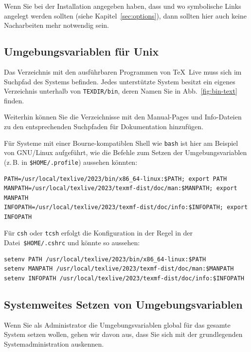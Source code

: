 \documentclass[12pt,ngerman,a4paper,fullparskip]{report}
\newcommand{\TL}{\TeX\ Live\xspace}
\newcommand{\prog}[1]{\texttt{#1}}
\newcommand{\filename}[1]{\texttt{#1}}
\newcommand{\dirname}[1]{\texttt{#1}}
\begin{document}
Wenn Sie bei der Installation angegeben haben, dass und wo symbolische Links angelegt werden sollten (siehe Kapitel~\ref{sec:options}), dann sollten hier auch keine Nacharbeiten mehr notwendig sein.

\subsection{Umgebungsvariablen für Unix}
\label{sec:env}

Das Verzeichnis mit den ausführbaren Programmen von \TL muss sich im Suchpfad des Systems befinden.
Jedes unterstützte System besitzt ein eigenes Verzeichnis unterhalb von \dirname{TEXDIR/bin}, deren
Namen Sie in Abb.~\ref{fig:bin-text} finden.

Weiterhin können Sie die Verzeichnisse mit den Manual-Pages und Info-Dateien zu den entsprechenden
Suchpfaden für Dokumentation hinzufügen.

Für Systeme mit einer Bourne-kompatiblen Shell wie \prog{bash} ist hier am Beispiel von GNU/Linux
aufgeführt, wie die Befehle zum Setzen der Umgebungsvariablen (z.\,B. in \filename{\$HOME/.profile})
aussehen könnten:

\begin{verbatim}
PATH=/usr/local/texlive/2023/bin/x86_64-linux:$PATH; export PATH
MANPATH=/usr/local/texlive/2023/texmf-dist/doc/man:$MANPATH; export MANPATH
INFOPATH=/usr/local/texlive/2023/texmf-dist/doc/info:$INFOPATH; export INFOPATH
\end{verbatim}


\noindent Für \prog{csh} oder \prog{tcsh} erfolgt die Konfiguration in der Regel in der Datei~\filename{\$HOME/.cshrc}
und könnte so aussehen:

\begin{verbatim}
setenv PATH /usr/local/texlive/2023/bin/x86_64-linux:$PATH
setenv MANPATH /usr/local/texlive/2023/texmf-dist/doc/man:$MANPATH
setenv INFOPATH /usr/local/texlive/2023/texmf-dist/doc/info:$INFOPATH
\end{verbatim}

\subsection{Systemweites Setzen von Umgebungsvariablen}
\label{sec:envglobal}


Wenn Sie als Administrator die Umgebungsvariablen global für das gesamte System setzen wollen,
gehen wir davon aus, dass Sie sich mit der grundlegenden Systemadministration auskennen.
\end{document}
